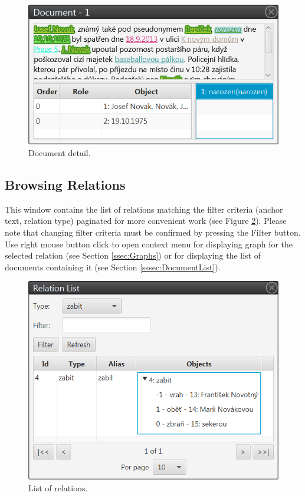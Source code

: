 \begin{figure}[!htb]
        \centering
        \includegraphics[width=\textwidth]{Images/documentview}
        \caption{Document detail.}
        \label{fig:DocumentView}
\end{figure}

\subsection{Browsing Relations}

This window contains the list of relations matching the filter criteria (anchor
text, relation type) paginated for more convenient work (see Figure
\ref{fig:RelationList}). Please note that changing filter criteria must be
confirmed by pressing the Filter button. Use right mouse button click to open
context menu for displaying graph for the selected relation (see Section
\ref{ssec:Graphs}) or for displaying the list of documents containing it (see
Section \ref{sssec:DocumentList}).

\begin{figure}[!htb]
        \centering
        \includegraphics[width=\textwidth]{Images/relationlist}
        \caption{List of relations.}
        \label{fig:RelationList}
\end{figure}

